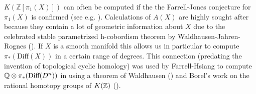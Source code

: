 $K(\mathbb{Z}[\pi_1(X)])$ can often be computed if the the Farrell-Jones conjecture for $\pi_1(X)$ is confirmed (see e.g. \cite{BartelsLückReich-FJC}). 
Calculations of $A(X)$ are highly sought after because they contain a lot of geometric information about $X$ due to the celebrated stable parametrized h-cobordism theorem by Waldhausen-Jahren-Rognes (\cite{WJR2013spaces}). If $X$ is a smooth manifold this allows us in particular to compute $\pi_*(\mathrm{Diff}(X))$ in a certain range of degrees. This connection (predating the invention of topological cyclic homology) was used by Farrell-Hsiang to compute $\mathbb{Q}\otimes\pi_*(\text{Diff}(D^n))$ in \cite{farrellhsiang1978rational} using a theorem of Waldhausen (\cite[Corollary~2.3.8]{waldhausen1985algebraic}) and Borel's work on the rational homotopy groups of $K(\mathbb{Z})$ (\cite[Chapter~12]{borel1974stable}).
